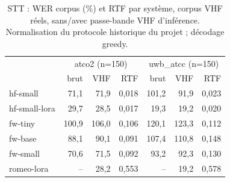 \begin{table}[t]\centering\small
\caption{STT : WER corpus (\%) et RTF par système, corpus VHF réels, sans/avec passe-bande VHF d'inférence. Normalisation du protocole historique du projet ; décodage greedy.}
\label{tab:stt}
\begin{tabular}{lrrrrrr}
\toprule
 & \multicolumn{3}{c}{atco2 (n=150)} & \multicolumn{3}{c}{uwb\_atcc (n=150)} \\
 & brut & VHF & RTF & brut & VHF & RTF \\
\midrule
hf-small & 71,1 & 71,9 & 0,018 & 101,2 & 91,9 & 0,023 \\
hf-small-lora & 29,7 & 28,5 & 0,017 & 19,3 & 19,2 & 0,020 \\
fw-tiny & 100,9 & 106,0 & 0,106 & 120,1 & 123,3 & 0,112 \\
fw-base & 88,1 & 90,1 & 0,091 & 107,4 & 110,8 & 0,148 \\
fw-small & 70,6 & 71,5 & 0,092 & 93,2 & 92,3 & 0,130 \\
romeo-lora & -- & 28,2 & 0,553 & -- & 19,2 & 0,578 \\
\bottomrule
\end{tabular}
\end{table}
